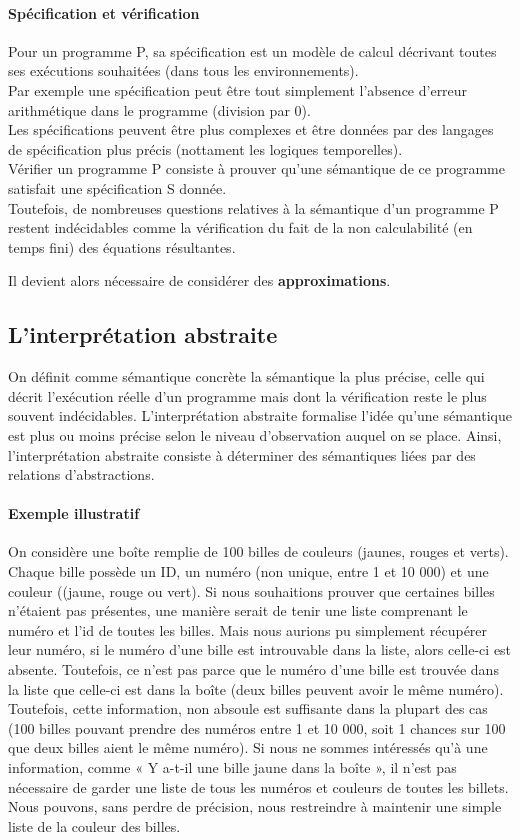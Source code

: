 \documentclass[french]{report}
\begin{document}
\paragraph{Spécification et vérification}
Pour un programme P, sa spécification est un modèle de calcul décrivant toutes ses
exécutions souhaitées (dans tous les environnements).  \\
Par exemple une spécification peut être tout simplement l'absence d'erreur arithmétique
dans le programme (division par 0). \\
Les spécifications peuvent être plus complexes et être données par des langages
de spécification plus précis (nottament les logiques temporelles). \\
Vérifier un programme P consiste à prouver qu’une sémantique de ce programme
satisfait une spécification S donnée. \\

Toutefois, de nombreuses questions relatives à la sémantique d'un programme P restent indécidables
comme la vérification du fait de la non calculabilité (en temps fini) des équations résultantes.

Il devient alors nécessaire de considérer des \textbf{approximations}.

\subsection{L'interprétation abstraite}
On définit comme sémantique concrète la sémantique la plus précise, celle qui décrit l'exécution
réelle d'un programme mais dont la vérification reste le plus souvent indécidables.
L’interprétation abstraite formalise l’idée qu’une sémantique est plus ou moins précise
selon le niveau d’observation auquel on se place. Ainsi, l'interprétation abstraite consiste à
déterminer des sémantiques liées par des relations d'abstractions.

\paragraph{Exemple illustratif}
On considère une boîte remplie de 100 billes de couleurs (jaunes, rouges et verts).
Chaque bille possède un ID, un numéro (non unique, entre 1 et 10 000)
et une couleur ((jaune, rouge ou vert).
Si nous souhaitions prouver que certaines billes n'étaient pas présentes, une manière serait
de tenir une liste comprenant le numéro et l'id de toutes les billes.
Mais nous aurions pu simplement récupérer leur numéro, si le numéro d'une bille est introuvable dans la liste,
alors celle-ci est absente. Toutefois, ce n'est pas parce que le numéro d'une bille est
trouvée dans la liste que celle-ci est dans la boîte (deux billes peuvent avoir le
même numéro). Toutefois, cette information, non absoule est suffisante dans la plupart
des cas (100 billes pouvant prendre des numéros entre 1 et 10 000, soit 1 chances sur 100 que deux billes aient
le même numéro).
Si nous ne sommes intéressés qu'à une information,
comme « Y a-t-il une bille jaune dans la boîte », il n'est
pas nécessaire de garder une liste de tous les numéros et couleurs de toutes les billets.
Nous pouvons, sans perdre de précision, nous
restreindre à maintenir une simple liste de la couleur des billes.
\end{document}
